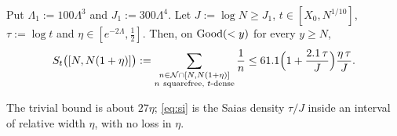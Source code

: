 \begin{lemma}\label{lem:si}
Put $\Lambda_1:=100\Lambda^3$ and $J_1:=300\Lambda^4$. Let $J:=\log N\ge J_1$, $t\in[X_0,N^{1/10}]$, $\tau:=\log t$ and
$\eta\in[e^{-2\Lambda},\frac12]$. Then, on $\mathrm{Good}(<y)$ for every $y\ge N$,
\begin{equation}\label{eq:si}
  S_t\bigl([N,N(1+\eta)]\bigr):=\sum_{\substack{n\in\mathcal{N}\cap[N,N(1+\eta)]\\ n\ \text{squarefree, $t$-dense}}}\frac1n
  \le61.1\Bigl(1+\frac{2.1\,\tau}J\Bigr)\frac{\eta\,\tau}J .
\end{equation}
\end{lemma}

The trivial bound is about $27\eta$; \eqref{eq:si} is the Saias density $\tau/J$ inside an interval of relative width
$\eta$, with no loss in $\eta$.

